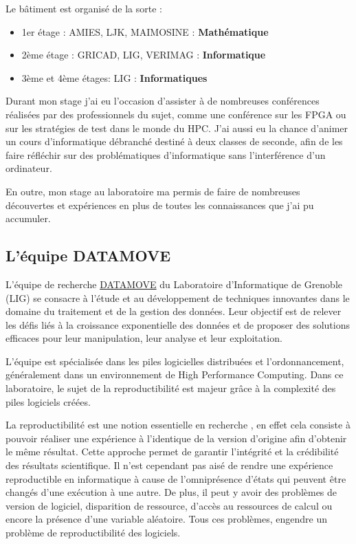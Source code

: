 \documentclass[a4paper,french,12pt, titlepage]{article}
\begin{document}
Le bâtiment est organisé de la sorte :

\begin{itemize}
\item
  1er étage : AMIES, LJK, MAIMOSINE : \textbf{Mathématique}
\item
  2ème étage : GRICAD, LIG, VERIMAG : \textbf{Informatique}
\item
  3ème et 4ème étages: LIG : \textbf{Informatiques}\newline
\end{itemize}

Durant mon stage j'ai eu l'occasion d'assister à de nombreuses
conférences réalisées par des professionnels du sujet, comme une
conférence sur les FPGA ou sur les stratégies de test dans le monde du
HPC. J'ai aussi eu la chance d'animer un cours d'informatique débranché
destiné à deux classes de seconde, afin de les faire réfléchir sur des
problématiques d'informatique sans l'interférence d'un
ordinateur.\newline

En outre, mon stage au laboratoire ma permis de faire de nombreuses
découvertes et expériences en plus de toutes les connaissances que j'ai
pu accumuler.

\hypertarget{luxe9quipe-datamove}{%
\subsection{L'équipe DATAMOVE}\label{luxe9quipe-datamove}}

L'équipe de recherche \href{https://www.inria.fr/fr/datamove}{DATAMOVE}
du Laboratoire d'Informatique de Grenoble (LIG) se consacre à l'étude et
au développement de techniques innovantes dans le domaine du traitement
et de la gestion des données. Leur objectif est de relever les défis
liés à la croissance exponentielle des données et de proposer des
solutions efficaces pour leur manipulation, leur analyse et leur
exploitation.\newline

L'équipe est spécialisée dans les piles logicielles distribuées et
l'ordonnancement, généralement dans un environnement de High Performance
Computing. Dans ce laboratoire, le sujet de la \gls{reproductibilité}
est majeur grâce à la complexité des piles logiciels créées.\newline

La reproductibilité est une notion essentielle en recherche
\cite{reproductibility2017}, en effet cela consiste à pouvoir réaliser
une expérience à l'identique de la version d'origine afin d'obtenir le
même résultat. Cette approche permet de garantir l'intégrité et la
crédibilité des résultats scientifique. Il n'est cependant pas aisé de
rendre une expérience reproductible en informatique à cause de
l'omniprésence d'états qui peuvent être changés d'une exécution à une
autre. De plus, il peut y avoir des problèmes de version de logiciel,
disparition de ressource, d'accès au ressources de calcul ou encore la
présence d'une variable aléatoire. Tous ces problèmes, engendre un
problème de reproductibilité des logiciels.\newline
\end{document}
